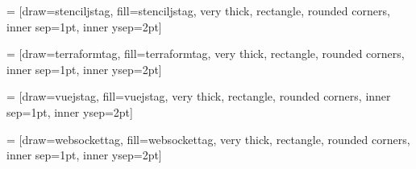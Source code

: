  = [draw=stenciljstag, fill=stenciljstag, very thick, rectangle, rounded corners, inner sep=1pt, inner ysep=2pt]
\newcommand{\stenciljstag}{\begin{tikzpicture}\node [stenciljstag] (box){{\scriptsize \textbf{\phantom{|}StencilJS\phantom{|}}}};\end{tikzpicture}}
\usepackage{tikz}
    
 = [draw=terraformtag, fill=terraformtag, very thick, rectangle, rounded corners, inner sep=1pt, inner ysep=2pt]
\newcommand{\terraformtag}{\begin{tikzpicture}\node [terraformtag] (box){{\scriptsize \color{white}{\textbf{\phantom{|}Terraform\phantom{|}}}}};\end{tikzpicture}}
\usepackage{tikz}
    
 = [draw=vuejstag, fill=vuejstag, very thick, rectangle, rounded corners, inner sep=1pt, inner ysep=2pt]
\newcommand{\vuejstag}{\begin{tikzpicture}\node [vuejstag] (box){{\scriptsize \color{white}{\textbf{\phantom{|}Vue.js\phantom{|}}}}};\end{tikzpicture}}
\usepackage{tikz}
    
 = [draw=websockettag, fill=websockettag, very thick, rectangle, rounded corners, inner sep=1pt, inner ysep=2pt]
\newcommand{\websockettag}{\begin{tikzpicture}\node [websockettag] (box){{\scriptsize \textbf{\phantom{|}WebSocket\phantom{|}}}};\end{tikzpicture}}
